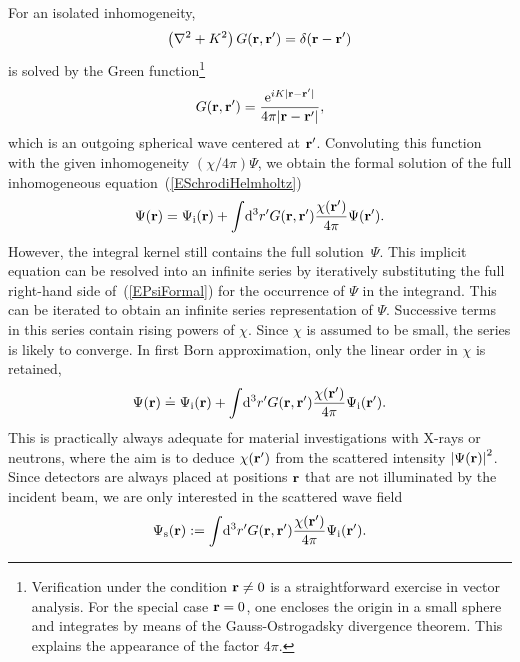 For an isolated inhomogeneity,
\begin{equation}\label{EHelmholtzForGreen}
  \left(\mathbf{\nabla}^2+K^2\right)G(\mathbf{r},\mathbf{r}') = \delta(\mathbf{r}-\mathbf{r}')
\end{equation}
is solved by the Green function\footnote
{Verification under the condition $\mathbf{r}\ne0$
is a straightforward exercise in vector analysis.
For the special case $\mathbf{r}=0$,
one encloses the origin in a small sphere
and integrates by means of the Gauss-Ostrogadsky divergence theorem.
This explains the appearance of the factor $4\pi$.}
\begin{equation}\label{EGreens1}
  G(\mathbf{r},\mathbf{r}') = \frac{{\rm e}^{iK|\mathbf{r}-\mathbf{r}'|}}{4\pi |\mathbf{r}-\mathbf{r}'|},
\end{equation}
which is an outgoing spherical wave centered at $\mathbf{r}'$.
Convoluting this function with the given inhomogeneity $(\chi/4\pi)\Psi$,
we obtain the formal solution
of the full inhomogeneous equation~(\ref{ESchrodiHelmholtz})
\begin{equation}\label{EPsiFormal}
  \Psi(\mathbf{r})
  = \Psi_\text{i}(\mathbf{r})
  + \int\!{\rm d}^3r' G(\mathbf{r},\mathbf{r}')
                     \frac{\chi(\mathbf{r}')}{4\pi}\Psi(\mathbf{r}').
\end{equation}
However, the integral kernel still contains the full solution~$\Psi$.
This implicit equation
can be resolved into an infinite series
by iteratively substituting the full right-hand side of~(\ref{EPsiFormal})
for the occurrence of $\Psi$ in the integrand.
This can be iterated to obtain an infinite series representation of $\Psi$.
Successive terms in this series contain rising powers of $\chi$.
Since $\chi$ is assumed to be small, the series is likely to converge.
In first Born approximation,
only the linear order in $\chi$ is retained,
\begin{equation}\label{EBorn}
  \Psi(\mathbf{r})
  \doteq \Psi_\text{i}(\mathbf{r})
  + \int\!{\rm d}^3r' G(\mathbf{r},\mathbf{r}')\frac{\chi(\mathbf{r}')}{4\pi}
   \Psi_\text{i}(\mathbf{r}').
\end{equation}
This is practically always adequate for
material investigations with X-rays or neutrons,
where the aim is to 
deduce $\chi(\mathbf{r}')$ from the scattered intensity ${|\Psi(\mathbf{r})|}^2$.
Since detectors are always placed at positions $\mathbf{r}$
that are not illuminated by the incident beam,
we are only interested in the scattered wave field
\begin{equation}\label{EBornS}
  \Psi_\text{s}(\mathbf{r})
  :=
  \int\!{\rm d}^3r' G(\mathbf{r},\mathbf{r}')\frac{\chi(\mathbf{r}')}{4\pi}\Psi_\text{i}(\mathbf{r}').
\end{equation}

